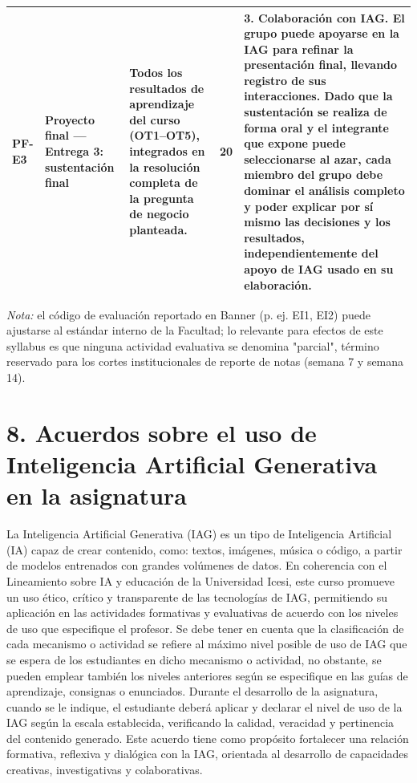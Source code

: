 \documentclass[11pt,a4paper]{article}
\begin{document}
\begin{center}
\begin{longtable}{|p{1.6cm}|p{2.6cm}|p{5.2cm}|p{0.8cm}|p{5.4cm}|}
PF-E3 & Proyecto final --- Entrega 3: sustentación final &
Todos los resultados de aprendizaje del curso (OT1--OT5), integrados en la resolución completa de la pregunta de negocio planteada. &
20 &
\textbf{3. Colaboración con IAG.} El grupo puede apoyarse en la IAG para refinar la presentación final, llevando registro de sus interacciones. Dado que la sustentación se realiza de forma oral y el integrante que expone puede seleccionarse al azar, cada miembro del grupo debe dominar el análisis completo y poder explicar por sí mismo las decisiones y los resultados, independientemente del apoyo de IAG usado en su elaboración. \\
\hline
\end{longtable}
\end{center}

\vspace{-0.3cm}
\noindent\textit{Nota:} el código de evaluación reportado en Banner (p. ej. EI1, EI2) puede ajustarse al estándar interno de la Facultad; lo relevante para efectos de este syllabus es que ninguna actividad evaluativa se denomina "parcial", término reservado para los cortes institucionales de reporte de notas (semana 7 y semana 14).

\section*{8. Acuerdos sobre el uso de Inteligencia Artificial Generativa en la asignatura}

La Inteligencia Artificial Generativa (IAG) es un tipo de Inteligencia Artificial (IA) capaz de crear contenido, como: textos, imágenes, música o código, a partir de modelos entrenados con grandes volúmenes de datos. En coherencia con el Lineamiento sobre IA y educación de la Universidad Icesi, este curso promueve un uso ético, crítico y transparente de las tecnologías de IAG, permitiendo su aplicación en las actividades formativas y evaluativas de acuerdo con los niveles de uso que especifique el profesor. Se debe tener en cuenta que la clasificación de cada mecanismo o actividad se refiere al máximo nivel posible de uso de IAG que se espera de los estudiantes en dicho mecanismo o actividad, no obstante, se pueden emplear también los niveles anteriores según se especifique en las guías de aprendizaje, consignas o enunciados. Durante el desarrollo de la asignatura, cuando se le indique, el estudiante deberá aplicar y declarar el nivel de uso de la IAG según la escala establecida, verificando la calidad, veracidad y pertinencia del contenido generado. Este acuerdo tiene como propósito fortalecer una relación formativa, reflexiva y dialógica con la IAG, orientada al desarrollo de capacidades creativas, investigativas y colaborativas.
\end{document}
